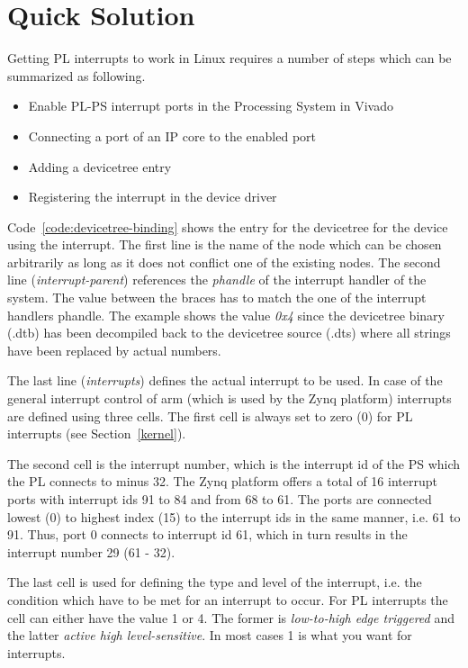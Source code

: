 \section{Quick Solution}\label{quick}
Getting PL interrupts to work in Linux requires a number of steps which can be
summarized as following.

\begin{itemize}
    \item Enable PL-PS interrupt ports in the Processing System in Vivado
    \item Connecting a port of an IP core to the enabled port
    \item Adding a devicetree entry
    \item Registering the interrupt in the device driver
\end{itemize}


Code~\ref{code:devicetree-binding} shows the entry for the devicetree for the device using the interrupt.
The first line is the name of the node which can be chosen arbitrarily as long as it does not conflict one of the existing nodes.
The second line (\emph{interrupt-parent}) references the \emph{phandle} of the interrupt handler of the system.
The value between the braces has to match the one of the interrupt handlers phandle.
The example shows the value \emph{0x4} since the devicetree binary (.dtb) has been decompiled back to the devicetree source (.dts) where all strings have been replaced by actual numbers.

The last line (\emph{interrupts}) defines the actual interrupt to be used.
In case of the general interrupt control of arm (which is used by the Zynq platform) interrupts are defined using three cells.
The first cell is always set to zero (0) for PL interrupts (see Section~\ref{kernel}).

The second cell is the interrupt number, which is the interrupt id of the PS which the PL connects to minus 32.
The Zynq platform offers a total of 16 interrupt ports with interrupt ids 91 to 84 and from 68 to 61.
The ports are connected lowest (0) to highest index (15) to the interrupt ids in the same manner, i.e. 61 to 91.
Thus, port 0 connects to interrupt id 61, which in turn results in the interrupt number 29 (61 - 32).

The last cell is used for defining the type and level of the interrupt, i.e. the condition which have to be met for an interrupt to occur.
For PL interrupts the cell can either have the value 1 or 4.
The former is \emph{low-to-high edge triggered} and the latter \emph{active high level-sensitive}.
In most cases 1 is what you want for interrupts.

